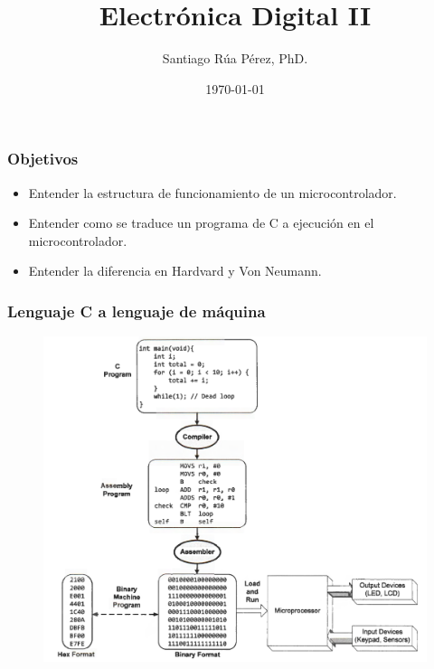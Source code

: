 \documentclass[10.5pt,scale=1.0,t,aspectratio=169,hyperref={pdfpagelabels=false}]{beamer}
\title{Electrónica Digital II}
\author{Santiago Rúa Pérez, PhD.}
\date{\today}
\begin{document}
	\begin{frame}
		\titlepage
	\end{frame}
	\frame{
		\begin{center}
			\LARGE \textcolor{blue}{INTRODUCCIÓN A LOS MICROCONTROLADORES}
		\end{center}
		
	}
	

\begin{frame}
\frametitle{Objetivos}
\begin{itemize}
\item Entender la estructura de funcionamiento de un microcontrolador.
\item Entender como se traduce un programa de C a ejecución en el microcontrolador.
\item Entender la diferencia en Hardvard y Von Neumann.
\end{itemize}
\end{frame}
\begin{frame}
	\frametitle{Lenguaje C a lenguaje de máquina}
	\begin{figure}
		\centering
		\includegraphics[scale=0.4]{LenguajeCMicros}
	\end{figure}
\end{frame}
\end{document}
